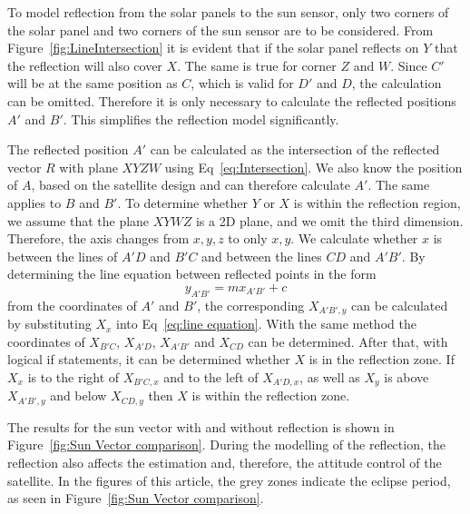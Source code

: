To model reflection from the solar panels to the sun sensor, only two corners of the solar panel and two corners of the sun sensor are to be considered. From Figure~\ref{fig:LineIntersection} it is evident that if the solar panel reflects on $Y$ that the reflection will also cover $X$. The same is true for corner $Z$ and $W$. Since $C'$ will be at the same position as $C$, which is valid for $D'$ and $D$, the calculation can be omitted. Therefore it is only necessary to calculate the reflected positions $A'$ and $B'$. This simplifies the reflection model significantly.

The reflected position $A'$ can be calculated as the intersection of the reflected vector $R$ with plane $XYZW$ using Eq~\ref{eq:Intersection}. We also know the position of $A$, based on the satellite design and can therefore calculate $A'$. The same applies to $B$ and $B'$. To determine whether $Y$ or $X$ is within the reflection region, we assume that the plane $XYWZ$ is a 2D plane, and we omit the third dimension. Therefore, the axis changes from $x, y, z$ to only $x, y$. We calculate whether $x$ is between the lines of $A'D$ and $B'C$ and between the lines $CD$ and $A'B'$. By determining the line equation between reflected points in the form 
\begin{equation}
	y_{A'B'} = mx_{A'B'} + c
	\label{eq:line equation}
\end{equation}
from the coordinates of $A'$ and $B'$, the corresponding $X_{A'B',y}$ can be calculated by substituting $X_x$ into Eq~\ref{eq:line equation}. With the same method the coordinates of $X_{B'C}$, $X_{A'D}$, $X_{A'B'}$ and $X_{CD}$ can be determined. After that, with logical if statements, it can be determined whether $X$ is in the reflection zone. If $X_x$ is to the right of $X_{B'C,x}$ and to the left of $X_{A'D,x}$, as well as $X_y$ is above $X_{A'B',y}$ and below $X_{CD,y}$ then $X$ is within the reflection zone. 

The results for the sun vector with and without reflection is shown in Figure~\ref{fig:Sun Vector comparison}. During the modelling of the reflection, the reflection also affects the estimation and, therefore, the attitude control of the satellite. In the figures of this article, the grey zones indicate the eclipse period, as seen in Figure~\ref{fig:Sun Vector comparison}.

